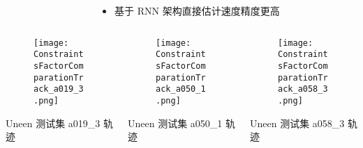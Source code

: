 \begin{frame}
\begin{columns}[t]
\begin{column}{0.6\textwidth}
{{				}		
			}
		\end{column}   
		\begin{column}{0.5\textwidth}
		\vspace{-0.5cm}
		{
		   	\small
			\begin{itemize}
				\item 基于 RNN 架构直接估计速度精度更高
			\end{itemize}
		 }
		\end{column}    
	\end{columns}
	\begin{columns}[t]
		\begin{column}{0.3\textwidth}
		   	\begin{figure}
    			\texttt{[image: ConstraintsFactorComparationTrack\_a019\_3.png]}
		   	\end{figure}
		   	\vspace{-0.5cm}
		   	\hspace{1.2cm} {\tiny Uneen 测试集 a019\_3 轨迹}
		\end{column}   
		\begin{column}{0.3\textwidth}
		   	\begin{figure}
    			\texttt{[image: ConstraintsFactorComparationTrack\_a050\_1.png]}
		   	\end{figure}
		   	\vspace{-0.5cm}
		   	\hspace{1.2cm} {\tiny Uneen 测试集 a050\_1 轨迹}
		\end{column}  
		\begin{column}{0.3\textwidth}
		   	\begin{figure}
    			\texttt{[image: ConstraintsFactorComparationTrack\_a058\_3.png]}
		   	\end{figure}
		   	\vspace{-0.5cm}
		   	\hspace{1.2cm} {\tiny Uneen 测试集 a058\_3 轨迹}
		\end{column}
	\end{columns} 	
\end{frame}

